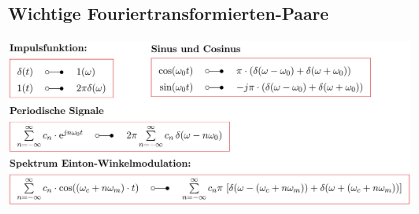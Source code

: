 

	
		\subsubsection{Wichtige Fouriertransformierten-Paare}
			\includegraphics[width=0.8\textwidth]{./bilder/fourierTransPaare.png}\\		